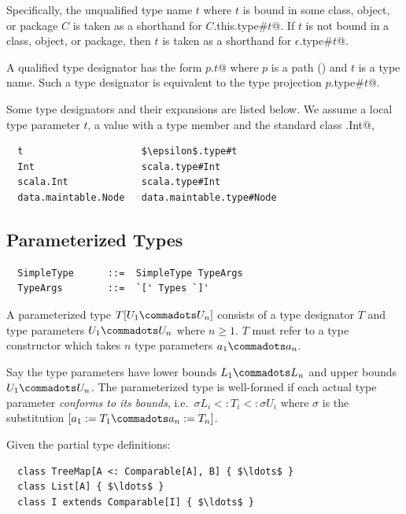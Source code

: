 Specifically, the unqualified type name $t$ where $t$ is bound in some
class, object, or package $C$ is taken as a shorthand for
\lstinline@$C$.this.type#$t$@. If $t$ is
not bound in a class, object, or package, then $t$ is taken as a
shorthand for \lstinline@$\epsilon$.type#$t$@.

A qualified type designator has the form \lstinline@$p$.$t$@ where $p$ is
a path () and $t$ is a type name. Such a type designator is
equivalent to the type projection \lstinline@$p$.type#$t$@.

\example 
Some type designators and their expansions are listed below. We assume
a local type parameter $t$, a value 
with a type member  and the standard class \lstinline@scala.Int@, 
\begin{lstlisting}
  t                     $\epsilon$.type#t
  Int                   scala.type#Int
  scala.Int             scala.type#Int
  data.maintable.Node   data.maintable.type#Node
\end{lstlisting}

\subsection{Parameterized Types}
\label{sec:param-types}

\syntax\begin{lstlisting}
  SimpleType      ::=  SimpleType TypeArgs
  TypeArgs        ::=  `[' Types `]'
\end{lstlisting}

A parameterized type $T[U_1 \commadots U_n]$ consists of a type
designator $T$ and type parameters $U_1 \commadots U_n$ where $n \geq
1$.  $T$ must refer to a type constructor which takes $n$ type
parameters $a_1 \commadots a_n$.

Say the type parameters have lower bounds $L_1 \commadots L_n$ and
upper bounds $U_1 \commadots U_n$.  The parameterized type is
well-formed if each actual type parameter {\em conforms to its
bounds}, i.e.\ $\sigma L_i <: T_i <: \sigma U_i$ where $\sigma$ is the
substitution $[a_1 := T_1 \commadots a_n := T_n]$.

\example\label{ex:param-types}
Given the partial type definitions:

\begin{lstlisting}
  class TreeMap[A <: Comparable[A], B] { $\ldots$ }
  class List[A] { $\ldots$ }
  class I extends Comparable[I] { $\ldots$ }
\end{lstlisting}

